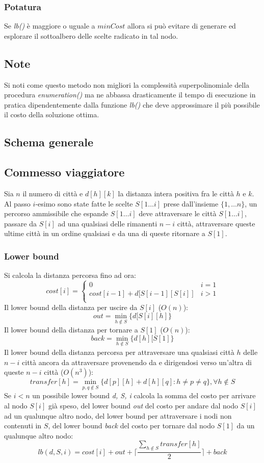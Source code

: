 \subsubsection{Potatura}
Se \emph{lb()} \`e maggiore o uguale a $minCost$ allora si pu\`o evitare di generare ed esplorare il sottoalbero delle scelte radicato in tal nodo.
\subsection{Note}
Si noti come questo metodo non migliori la complessit\`a superpolinomiale della procedura \emph{enumeration()} ma ne abbassa drasticamente il tempo di esecuzione in pratica 
dipendentemente dalla funzione \emph{lb()} che deve approssimare il pi\`u possibile il costo della soluzione ottima. 
\subsection{Schema generale}

\subsection{Commesso viaggiatore}
Sia $n$ il numero di citt\`a e $d[h][k]$ la distanza intera positiva fra le citt\`a $h$ e $k$. Al passo $i$-esimo sono state fatte le scelte $S[1\dots i]$ prese dall'insieme 
$\{1,\dots n\}$, un percorso ammissibile che espande $S[1\dots i]$ deve attraversare le citt\`a $S[1\dots i]$, passare da $S[i]$ ad una qualsiasi delle rimanenti $n-i$ citt\`a, 
attraversare queste ultime citt\`a in un ordine qualsiasi e da una di queste ritornare a $S[1]$. 
\subsubsection{Lower bound}
Si calcola la distanza percorsa fino ad ora:
$$cost[i] = 
\begin{cases}
	0 & i = 1\\
	cost[i - 1] + d[S[i - 1][S[i]] & i > 1\\
\end{cases}$$
Il lower bound della distanza per uscire da $S[i]$ ($O(n)$):
$$out = \min\limits_{h\not\in S}\{d[S[i][h]\}$$
Il lower bound della distanza per tornare a $S[1]$ ($O(n)$):
$$back = \min\limits_{h\not\in S}\{d[h][S[1]\}$$
Il lower bound della distanza percorsa per attraversare una qualsiasi citt\`a $h$ delle $n-i$ citt\`a ancora da attraversare provenendo da e dirigendosi verso un'altra di queste $n-i$
citt\`a ($O(n^3)$):
$$transfer[h] = \min\limits_{p, q\not\in S}\{d[p][h] + d[h][q] : h\neq p\neq q\}, \forall h\not\in S$$
Se $i<n$ un possibile lower bound \emph{d, S, i} calcola la somma del costo per arrivare al nodo $S[i]$ gi\`a speso, del lower bound \emph{out} del costo per andare dal nodo $S[i]$ ad un
qualunque altro nodo, del lower bound per attraversare i nodi non contenuti in $S$, del lower bound \emph{back} del costo per tornare dal nodo $S[1]$ da un qualunque altro nodo:
$$lb(d, S, i) = cost[i] + out +\biggl\lceil\dfrac{\sum\limits_{h\not\in S}transfer[h]}{2}\biggr\rceil + back$$
